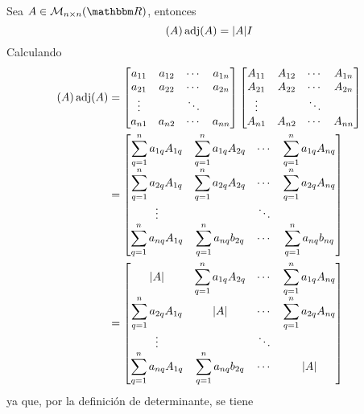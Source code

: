 \begin{theorem}
    Sea $A \in \mathcal{M}_{n \times n}(\RR)$, entonces
    $$(A) \operatorname{adj}(A) = |A|I$$\newpage
    \demostracion
    Calculando
    \begin{align*}
        (A) \operatorname{adj}(A) & = \begin{bmatrix}
            a_{11} & a_{12} & \cdots & a_{1n}\\
            a_{21} & a_{22} & \cdots & a_{2n}\\
            \vdots &  & \ddots & \\
            a_{n1} & a_{n2} & \cdots & a_{nn}
        \end{bmatrix} \begin{bmatrix}
            A_{11} & A_{12} & \cdots & A_{1n}\\
            A_{21} & A_{22} & \cdots & A_{2n}\\
            \vdots &  & \ddots & \\
            A_{n1} & A_{n2} & \cdots & A_{nn}
        \end{bmatrix} \\
        & = \begin{bmatrix}
            \displaystyle\sum_{q=1}^{n} a_{1q}A_{1q} & \displaystyle\sum_{q=1}^{n} a_{1q}A_{2q} & \cdots & \displaystyle\sum_{q=1}^{n} a_{1q}A_{nq} \\
            \displaystyle\sum_{q=1}^{n} a_{2q}A_{1q} & \displaystyle\sum_{q=1}^{n} a_{2q}A_{2q} & \cdots & \displaystyle\sum_{q=1}^{n} a_{2q}A_{nq} \\
            \vdots & & \ddots & \\
            \displaystyle\sum_{q=1}^{n} a_{nq}A_{1q} & \displaystyle\sum_{q=1}^{n} a_{nq}b_{2q} & \cdots & \displaystyle\sum_{q=1}^{n} a_{nq}b_{nq}
        \end{bmatrix} \\
        & = \begin{bmatrix}
            |A| & \displaystyle\sum_{q=1}^{n} a_{1q}A_{2q} & \cdots & \displaystyle\sum_{q=1}^{n} a_{1q}A_{nq} \\
            \displaystyle\sum_{q=1}^{n} a_{2q}A_{1q} & |A| & \cdots & \displaystyle\sum_{q=1}^{n} a_{2q}A_{nq} \\
            \vdots & & \ddots & \\
            \displaystyle\sum_{q=1}^{n} a_{nq}A_{1q} & \displaystyle\sum_{q=1}^{n} a_{nq}b_{2q} & \cdots & |A|
        \end{bmatrix}
    \end{align*}
    ya que, por la definición de determinante, se tiene

\end{theorem}
